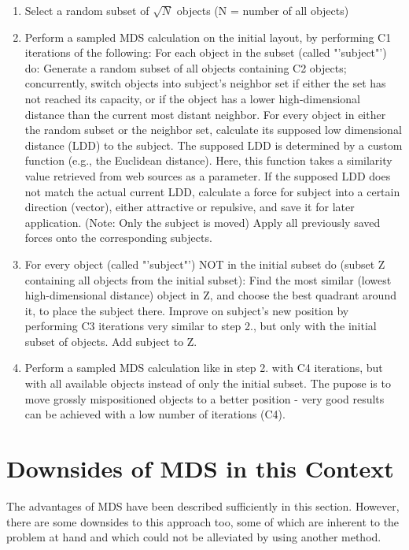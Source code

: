 \begin{enumerate}
	\item Select a random subset of $\sqrt{N}$ objects (N = number of all objects)
	\item Perform a sampled MDS calculation on the initial layout, by performing C1 iterations of the following:
		\subitem For each object in the subset (called "'subject"') do:
			\subsubitem Generate a random subset of all objects containing C2 objects; concurrently, switch objects into subject's neighbor set if either the set has not reached its capacity, or if the object has a lower high-dimensional distance than the current most distant neighbor.
			\subsubitem For every object in either the random subset or the neighbor set, calculate its supposed low dimensional distance (LDD) to the subject. The supposed LDD is determined by a custom function (e.g., the Euclidean distance). Here, this function takes a similarity value retrieved from web sources as a parameter.
			\subsubitem If the supposed LDD does not match the actual current LDD, calculate a force for subject into a certain direction (vector), either attractive or repulsive, and save it for later application. (Note: Only the subject is moved)
		\subitem Apply all previously saved forces onto the corresponding subjects.
	\item For every object (called "'subject"') NOT in the initial subset do (subset Z containing all objects from the initial subset):
		\subitem Find the most similar (lowest high-dimensional distance) object in Z, and choose the best quadrant around it, to place the subject there. 
		\subitem Improve on subject's new position by performing C3 iterations very similar to step 2., but only with the initial subset of objects.
		\subitem Add subject to Z.
	\item Perform a sampled MDS calculation like in step 2. with C4 iterations, but with all available objects instead of only the initial subset. The pupose is to move grossly mispositioned objects to a better position - very good results can be achieved with a low number of iterations (C4).
		
\end{enumerate}

\section{Downsides of MDS in this Context}

The advantages of MDS have been described sufficiently in this section. However, there are some downsides to this approach too, some of which are inherent to the problem at hand and which could not be alleviated by using another method.

